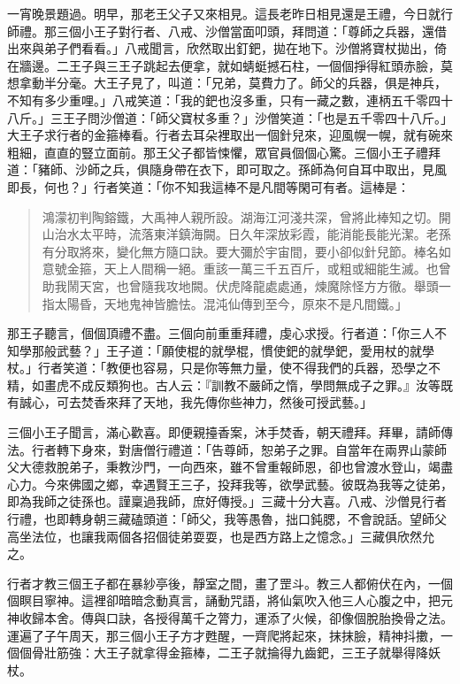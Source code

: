 一宵晚景題過。明早，那老王父子又來相見。這長老昨日相見還是王禮，今日就行師禮。那三個小王子對行者、八戒、沙僧當面叩頭，拜問道：「尊師之兵器，還借出來與弟子們看看。」八戒聞言，欣然取出釘鈀，拋在地下。沙僧將寶杖拋出，倚在牆邊。二王子與三王子跳起去便拿，就如蜻蜓撼石柱，一個個掙得紅頭赤臉，莫想拿動半分毫。大王子見了，叫道：「兄弟，莫費力了。師父的兵器，俱是神兵，不知有多少重哩。」八戒笑道：「我的鈀也沒多重，只有一藏之數，連柄五千零四十八斤。」三王子問沙僧道：「師父寶杖多重？」沙僧笑道：「也是五千零四十八斤。」大王子求行者的金箍棒看。行者去耳朵裡取出一個針兒來，迎風幌一幌，就有碗來粗細，直直的豎立面前。那王父子都皆悚懼，眾官員個個心驚。三個小王子禮拜道：「豬師、沙師之兵，俱隨身帶在衣下，即可取之。孫師為何自耳中取出，見風即長，何也？」行者笑道：「你不知我這棒不是凡間等閑可有者。這棒是：
\begin{quote}
鴻濛初判陶鎔鐵，大禹神人親所設。湖海江河淺共深，曾將此棒知之切。開山治水太平時，流落東洋鎮海闕。日久年深放彩霞，能消能長能光潔。老孫有分取將來，變化無方隨口訣。要大彌於宇宙間，要小卻似針兒節。棒名如意號金箍，天上人間稱一絕。重該一萬三千五百斤，或粗或細能生滅。也曾助我鬧天宮，也曾隨我攻地闕。伏虎降龍處處通，煉魔除怪方方徹。舉頭一指太陽昏，天地鬼神皆膽怯。混沌仙傳到至今，原來不是凡間鐵。」
\end{quote}

那王子聽言，個個頂禮不盡。三個向前重重拜禮，虔心求授。行者道：「你三人不知學那般武藝？」王子道：「願使棍的就學棍，慣使鈀的就學鈀，愛用杖的就學杖。」行者笑道：「教便也容易，只是你等無力量，使不得我們的兵器，恐學之不精，如畫虎不成反類狗也。古人云：『訓教不嚴師之惰，學問無成子之罪。』汝等既有誠心，可去焚香來拜了天地，我先傳你些神力，然後可授武藝。」

三個小王子聞言，滿心歡喜。即便親擡香案，沐手焚香，朝天禮拜。拜畢，請師傳法。行者轉下身來，對唐僧行禮道：「告尊師，恕弟子之罪。自當年在兩界山蒙師父大德救脫弟子，秉教沙門，一向西來，雖不曾重報師恩，卻也曾渡水登山，竭盡心力。今來佛國之鄉，幸遇賢王三子，投拜我等，欲學武藝。彼既為我等之徒弟，即為我師之徒孫也。謹稟過我師，庶好傳授。」三藏十分大喜。八戒、沙僧見行者行禮，也即轉身朝三藏磕頭道：「師父，我等愚魯，拙口鈍腮，不會說話。望師父高坐法位，也讓我兩個各招個徒弟耍耍，也是西方路上之憶念。」三藏俱欣然允之。

行者才教三個王子都在暴紗亭後，靜室之間，畫了罡斗。教三人都俯伏在內，一個個瞑目寧神。這裡卻暗暗念動真言，誦動咒語，將仙氣吹入他三人心腹之中，把元神收歸本舍。傳與口訣，各授得萬千之膂力，運添了火候，卻像個脫胎換骨之法。運遍了子午周天，那三個小王子方才甦醒，一齊爬將起來，抹抹臉，精神抖擻，一個個骨壯筋強：大王子就拿得金箍棒，二王子就掄得九齒鈀，三王子就舉得降妖杖。

